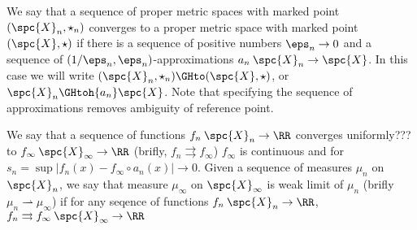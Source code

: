 We say that a sequence of proper metric spaces with marked point $(\spc{X}_n,\star_n)$ converges to a proper metric space with marked point $(\spc{X},\star)$ if there is a sequence of positive numbers $\eps_n\to0$ and a sequence of $(1/{\eps_n},\eps_n)$-approximations $a_n\:\spc{X}_n\to \spc{X}$.
In this case we will write $(\spc{X}_n,\star_n)\GHto (\spc{X},\star)$, 
or $\spc{X}_n\GHtoh{a_n} \spc{X}$.
Note that specifying the sequence of approximations removes ambiguity of reference point.
















We say that a sequence of functions $f_n\:\spc{X}_n\to\RR$
converges uniformly??? to $f_\infty\:\spc{X}_\infty\to\RR$ 
(brifly, $f_n\rightrightarrows f_\infty$)
$f_\infty$ is continuous and for $s_n=\sup|f_n(x)-f_\infty\circ a_n(x)|\to 0$.
Given a sequence of measures $\mu_n$ on $\spc{X}_n$, 
we say that measure $\mu_\infty$ on $\spc{X}_\infty$ 
is weak limit of $\mu_n$ (brifly $\mu_n\rightharpoonup\mu_\infty$) if for any seqence of functions $f_n\:\spc{X}_n\to\RR$,
$f_n\rightrightarrows f_\infty\:\spc{X}_\infty\to\RR$














